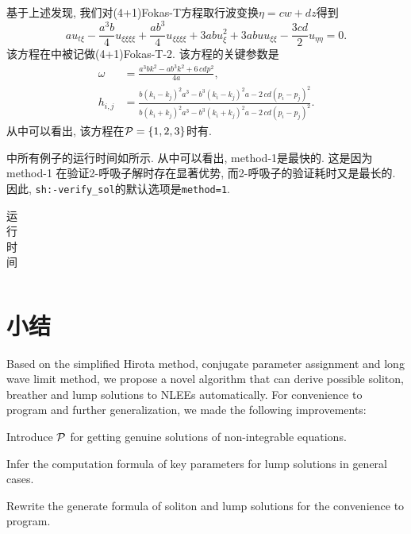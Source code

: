 基于上述发现, 我们对(4+1)Fokas-T方程取行波变换$\eta=cw+dz$得到
\begin{equation}
    au_{t\xi}-\frac{a^3b}{4}u_{\xi\xi\xi\xi}+\frac{ab^3}{4}u_{\xi\xi\xi\xi}+3abu_{\xi}^2+3abuu_{\xi\xi}-\frac{3cd}{2}u_{\eta\eta}=0.  \label{Fokas-T-2}
\end{equation}
该方程在中被记做(4+1)Fokas-T-2. 该方程的关键参数是
\begin{equation}
\begin{split}
    \omega&={\frac {{a}^{3}b{k}^{2}-a{b}^{3}{k}^{2}+6\,cd{p}^{2}}{4a}}, \\ 
    h_{{i,j}}&={\frac {b \left( k_{{i}}-k_{{j}} \right) ^{2}{a}^{3}-{b}^{3}
    \left( k_{{i}}-k_{{j}} \right) ^{2}a-2\,cd \left( p_{{i}}-p_{{j}}
    \right) ^{2}}{b \left( k_{{i}}+k_{{j}} \right) ^{2}{a}^{3}-{b}^{3}
    \left( k_{{i}}+k_{{j}} \right) ^{2}a-2\,cd \left( p_{{i}}-p_{{j}}
    \right) ^{2}}}.
\end{split}
\end{equation}
从中可以看出, 该方程在$\mathcal{P}=\{1,2,3\}$时有\TrueSol{}.

中所有例子的运行时间如所示. 从中可以看出, method-1是最快的. 这是因为 method-1 在验证2-呼吸子解时存在显著优势, 而2-呼吸子的验证耗时又是最长的. 因此, \texttt{sh:-verify\_sol}的默认选项是\texttt{method=1}. 

\begin{table}[htbp]
\centering 
\caption{运行时间} \label{runtime}
\begin{tabular}{c|ccc|c}
\hline

\hline
\end{tabular}
\end{table}

\section{小结}
Based on the simplified Hirota method, conjugate parameter assignment and long wave limit method, we propose a novel algorithm that can derive possible soliton, breather and lump solutions to NLEEs automatically. For convenience to program and further generalization, we made the following improvements:
\begin{compactitem}[\textbullet]
\item Introduce $\mathcal{P}$ for getting genuine solutions of non-integrable equations.
\item Infer the computation formula of key parameters for lump solutions in general cases.
\item Rewrite the generate formula of soliton and lump solutions for the convenience to program. 
\end{compactitem}

